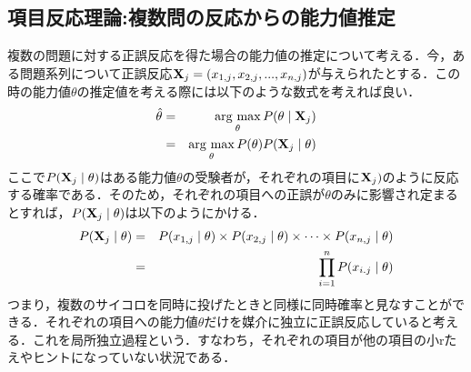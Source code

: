 \documentclass[12pt]{jarticle}
\begin{document}
\subsection{項目反応理論:複数問の反応からの能力値推定}
複数の問題に対する正誤反応を得た場合の能力値の推定について考える．今，ある問題系列について正誤反応${\bf X}_j=(x_{1,j},x_{2,j},...,x_{n,j})$が与えられたとする．この時の能力値$\theta$の推定値を考える際には以下のような数式を考えれば良い．
\begin{eqnarray}
    \hat{\theta}&=& \mathop{\rm arg~max}\limits_{\theta} P(\theta \mid {\bf X}_j)\\
    &=& \mathop{\rm arg~max}\limits_{\theta} P(\theta)P({\bf X}_j \mid \theta)
\end{eqnarray}
ここで$P({\bf X}_j \mid \theta)$はある能力値$\theta$の受験者が，それぞれの項目に${\bf X}_j)$のように反応する確率である．そのため，それぞれの項目への正誤が$\theta$のみに影響され定まるとすれば，$P({\bf X}_j \mid \theta)$は以下のようにかける．
\begin{eqnarray}
    P({\bf X}_j \mid \theta)&=&P(x_{1,j} \mid \theta)\times P(x_{2,j} \mid \theta) \times \cdots \times P(x_{n,j} \mid \theta)\\
    &=& \prod_{i=1}^n P(x_{i.j}\mid \theta)
\end{eqnarray}
つまり，複数のサイコロを同時に投げたときと同様に同時確率と見なすことができる．それぞれの項目への能力値$\theta$だけを媒介に独立に正誤反応していると考える．これを局所独立過程という．すなわち，それぞれの項目が他の項目の小rたえやヒントになっていない状況である．\\
\end{document}
